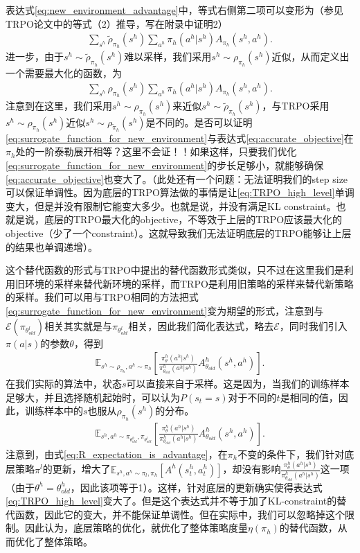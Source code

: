 \documentclass[degree=bachelor, tocarialchapter, pifootnote]{thuthesis}
\begin{document}
表达式\eqref{eq:new_environment_advantage}中，等式右侧第二项可以变形为（参见TRPO论文中的等式（2）推导，写在附录中证明2）
\begin{align}
  \sum_{s^h}\tilde{\rho}_{\pi_h}(s^h)\sum_{a^h}\pi_h(a^h|s^h)A_{\pi_h}(s^h,a^h).
  \label{eq:accurate_objective}
\end{align}
进一步，由于$s^h \sim \tilde{\rho}_{\pi_h}(s^h)$难以采样，我们采用$s^h \sim \rho_{\pi_h}(s^h)$近似，从而定义出一个需要最大化的函数，为
\begin{align}
  \sum_{s^h}\rho_{\pi_h}(s^h)\sum_{a^h}\pi_h(a^h|s^h)A_{\pi_h}(s^h,a^h).
  \label{eq:surrogate_function_for_new_environment}
\end{align}
注意到在这里，我们采用$s^h \sim \rho_{\pi_h}(s^h)$来近似$s^h \sim \tilde{\rho}_{\pi_h}(s^h)$，与TRPO采用$s^h \sim \rho_{\pi_h}(s^h)$近似$s^h \sim \rho_{\tilde{\pi}_h}(s^h)$是不同的。是否可以证明\eqref{eq:surrogate_function_for_new_environment}与表达式\eqref{eq:accurate_objective}在$\pi_h$处的一阶泰勒展开相等？这里不会证！！如果这样，只要我们优化\eqref{eq:surrogate_function_for_new_environment}的步长足够小，就能够确保\eqref{eq:accurate_objective}也变大了。（此处还有一个问题：无法证明我们的step size可以保证单调性。因为底层的TRPO算法做的事情是让\eqref{eq:TRPO_high_level}单调变大，但是并没有限制它能变大多少。也就是说，并没有满足KL constraint。也就是说，底层的TRPO最大化的objective，不等效于上层的TRPO应该最大化的objective（少了一个constraint）。这就导致我们无法证明底层的TRPO能够让上层的结果也单调递增）。

这个替代函数的形式与TRPO中提出的替代函数形式类似，只不过在这里我们是利用旧环境的采样来替代新环境的采样，而TRPO是利用旧策略的采样来替代新策略的采样。我们可以用与TRPO相同的方法把式\eqref{eq:surrogate_function_for_new_environment}变为期望的形式，注意到与$\mathcal{E}(\pi_{\theta_{old}^l})$相关其实就是与$\pi_{\theta_{old}^l}$相关，因此我们简化表达式，略去$\mathcal{E}$，同时我们引入$\pi(a|s)$的参数$\theta$，得到
\begin{align}
  \mathbb{E}_{s^h \sim \rho_{\pi_h}, a^h \sim \pi_h }[\frac{\pi_\theta^h (a^h|s^h)}{\pi_{\theta_{old}}^h(a^h|s^h)}A_{\theta_{old}}^h(s^h, a^h)].
  \label{eq:TRPO_high_level}
\end{align}
在我们实际的算法中，状态$s$可以直接来自于采样。这是因为，当我们的训练样本足够大，并且选择随机起始时，可以认为$P(s_t = s)$对于不同的$t$是相同的值，因此，训练样本中的$s$也服从$\rho_{\pi_h}(s^h)$的分布。
\begin{align}
  \mathbb{E}_{s^h, a^h \sim \pi_{\theta_{old}^h},\pi_{\theta_{old}^l}} [\frac{\pi_\theta^h (a^h|s^h)}{\pi_{\theta_{old}}^h(a^h|s^h)}A_{\theta_{old}}^h(s^h, a^h)].
  \label{eq:TRPO_high_level}
\end{align}
注意到，由式\eqref{eq:R_expectation_is_advantage}，在$\pi_h$不变的条件下，我们针对底层策略$\pi^l$的更新，增大了$\mathbb{E}_{s^h, a^h \sim \pi_l, \pi_h}[A^h(s_t^h, a_t^h)]$，却没有影响$\frac{\pi_\theta^h (a^h|s^h)}{\pi_{\theta_{old}}^h(a^h|s^h)}$这一项（由于$\theta^h = \theta_{old}^h$，因此该项等于1）。这样，针对底层的更新确实使得表达式\eqref{eq:TRPO_high_level}变大了。但是这个表达式并不等于加了KL-constraint的替代函数，因此它的变大，并不能保证单调性。但在实际中，我们可以忽略掉这个限制。因此认为，底层策略的优化，就优化了整体策略度量$\eta(\pi_h)$的替代函数，从而优化了整体策略。
\end{document}
